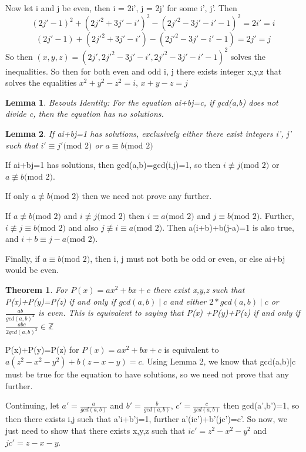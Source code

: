 \documentclass{article}
\newtheorem{theorem}{Theorem}[section]
\newtheorem{lemma}{Lemma}
\begin{document}
Now let i and j be even, then i = 2i', j = 2j' for some i', j'. Then 
$$(2j'-1)^2+(2j'^2+3j'-i')^2-(2j'^2-3j'-i'-1)^2 = 2i'=i$$
$$(2j'-1)+(2j'^2+3j'-i')-(2j'^2-3j'-i'-1) = 2j'=j$$
So then $(x,y,z) = (2j',2j'^2-3j'-i',2j'^2-3j'-i'-1)^2$ solves the inequalities. So then for both even and odd i, j there exists integer x,y,z that solves the equalities $x^2+y^2-z^2 = i$, $x+y-z=j$

\begin{lemma} %
\emph{Bezouts Identity: }
For the equation ai+bj=c, if gcd(a,b) does not divide c, then the equation has no solutions.
\end{lemma}

\begin{lemma} %
If ai+bj=1 has solutions, exclusively either there exist integers i', j' such that $i'\equiv j'\text{(mod  2)}$ or $a\equiv b\text{(mod  2)}$
\end{lemma}
If ai+bj=1 has solutions, then gcd(a,b)=gcd(i,j)=1, so then $i\not\equiv j \text{(mod  2)}$ or $a\not\equiv b\text{(mod  2)}$. 

If only $a\not\equiv b\text{(mod  2)}$ then we need not prove any further.

If $a\not\equiv b \text{(mod  2)}$ and $i\not\equiv j \text{(mod  2)}$ then $i\equiv a\text{(mod  2)}$ and $j\equiv b\text{(mod  2)}$. Further, $i\not\equiv j \equiv b\text{(mod  2)}$ and also $j\not\equiv i \equiv a \text{(mod  2)}$. Then a(i+b)+b(j-a)=1 is also true, and $i+b\equiv j-a\text{(mod  2)}$.

Finally, if $a\equiv b\text{(mod  2)}$, then i, j must not both be odd or even, or else ai+bj would be even. 

\begin{theorem}
For $P(x)=ax^2+bx+c$ there exist x,y,z such that P(x)+P(y)=P(z) if and only if $gcd(a,b)\mid c$ and either $2*gcd(a,b)\mid c$ or $\frac{ab}{gcd(a,b)^2}$ is even. This is equivalent to saying that P(x) +P(y)+P(z) if and only if $\frac{abc}{2gcd(a,b)^3}\in \mathbb{Z}$
\end{theorem}
P(x)+P(y)=P(z) for $P(x)=ax^2+bx+c$ is equivalent to $a(z^2-x^2-y^2)+b(z-x-y)=c$. Using Lemma 2, we know that gcd(a,b)|c must be true for the equation to have solutions, so we need not prove that any further.

Continuing, let $a'=\frac{a}{gcd(a,b)}$ and $b'=\frac{b}{gcd(a,b)}$, $c'=\frac{c}{gcd(a,b)}$ then gcd(a',b')=1, so then there exists i,j such that a'i+b'j=1, further a'(ic')+b'(jc')=c'. So now, we just need to show that there exists x,y,z  such that $ic' = z^2-x^2-y^2$ and $jc'=z-x-y$.
\end{document}
